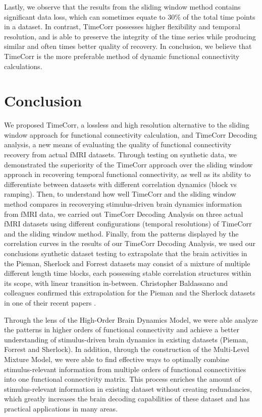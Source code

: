 \documentclass[11pt]{article}
\begin{document}
Lastly, we observe that the results from the sliding window method contains significant data loss, which can sometimes equate to $30\%$ of the total time points in a dataset. In contrast, TimeCorr possesses higher flexibility and temporal resolution, and is able to preserve the integrity of the time series while producing similar and often times better quality of recovery. In conclusion, we believe that TimeCorr is the more preferable method of dynamic functional connectivity calculations.


\clearpage
\newpage
\section{Conclusion}
We proposed TimeCorr, a lossless and high resolution alternative to the sliding window approach for functional connectivity calculation, and TimeCorr Decoding analysis, a new means of evaluating the quality of functional connectivity recovery from actual fMRI datasets. Through testing on synthetic data, we demonstrated the superiority of the TimeCorr approach over the sliding window approach in recovering temporal functional connectivity, as well as its ability to differentiate between datasets with different correlation dynamics (block vs ramping). Then, to understand how well TimeCorr and the sliding window method compares in recoverying stimulus-driven brain dynamics information from fMRI data, we carried out TimeCorr Decoding Analysis on three actual fMRI datasets using different configurations (temporal resolutions) of TimeCorr and the sliding window method. Finally, from the patterns displayed by the correlation curves in the results of our TimeCorr Decoding Analysis, we used our conclusions synthetic dataset testing to extrapolate that the brain activities in the Pieman, Sherlock and Forrest datasets may consist of a mixture of multiple different length time blocks, each possessing stable correlation structures within its scope, with linear transition in-between. Christopher Baldassano and colleagues confirmed this extrapolation for the Pieman and the Sherlock datasets in one of their recent papers \citep{Baldassano2016}.

Through the lens of the High-Order Brain Dynamics Model, we were able analyze the patterns in higher orders of functional connectivity and achieve a better understanding of stimulus-driven brain dynamics in existing datasets (Pieman, Forrest and Sherlock). In addition, through the construction of the Multi-Level Mixture Model, we were able to find effective ways to optimally combine stimulus-relevant information from multiple orders of functional connectivities into one functional connectivity matrix. This process enriches the amount of stimulus-relevant information in existing dataset without creating redundancies, which greatly increases the brain decoding capabilities of these dataset and has practical applications in many areas.
\end{document}
